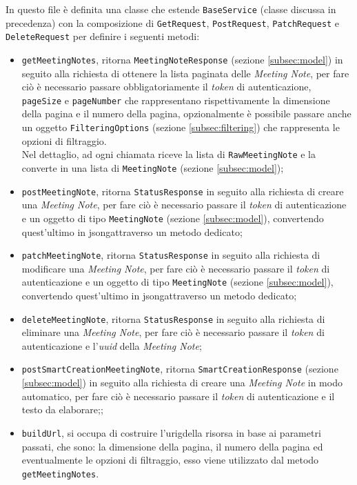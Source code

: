 In questo file è definita una classe che estende \lstinline{BaseService} (classe discussa in precedenza) con la composizione di \lstinline{GetRequest}, \lstinline{PostRequest}, \lstinline{PatchRequest} e \lstinline{DeleteRequest} per definire i seguenti metodi:
\begin{itemize}
    \item \lstinline{getMeetingNotes}, ritorna \lstinline{MeetingNoteResponse} (sezione \ref{subsec:model}) in seguito alla richiesta di ottenere la lista paginata delle \emph{Meeting Note}, per fare ciò è necessario passare obbligatoriamente il \emph{token} di autenticazione, \lstinline{pageSize} e \lstinline{pageNumber} che rappresentano rispettivamente la dimensione della pagina e il numero della pagina, opzionalmente è possibile passare anche un oggetto \lstinline{FilteringOptions} (sezione \ref{subsec:filtering}) che rappresenta le opzioni di filtraggio. \\
    Nel dettaglio, ad ogni chiamata riceve la lista di \lstinline{RawMeetingNote} e la converte in una lista di \lstinline{MeetingNote} (sezione \ref{subsec:model});
    \item \lstinline{postMeetingNote}, ritorna \lstinline{StatusResponse} in seguito alla richiesta di creare una \emph{Meeting Note}, per fare ciò è necessario passare il \emph{token} di autenticazione e un oggetto di tipo \lstinline{MeetingNote} (sezione \ref{subsec:model}), convertendo quest'ultimo in \gls{jsong}\glsoccur attraverso un metodo dedicato;
    \item \lstinline{patchMeetingNote}, ritorna \lstinline{StatusResponse} in seguito alla richiesta di modificare una \emph{Meeting Note}, per fare ciò è necessario passare il \emph{token} di autenticazione e un oggetto di tipo \lstinline{MeetingNote} (sezione \ref{subsec:model}), convertendo quest'ultimo in \gls{jsong}\glsoccur attraverso un metodo dedicato;
    \item \lstinline{deleteMeetingNote}, ritorna \lstinline{StatusResponse} in seguito alla richiesta di eliminare una \emph{Meeting Note}, per fare ciò è necessario passare il \emph{token} di autenticazione e l'\emph{uuid} della \emph{Meeting Note};
    \item \lstinline{postSmartCreationMeetingNote}, ritorna \lstinline{SmartCreationResponse} (sezione \ref{subsec:model}) in seguito alla richiesta di creare una \emph{Meeting Note} in modo automatico, per fare ciò è necessario passare il \emph{token} di autenticazione e il testo da elaborare;;
    \item \lstinline{buildUrl}, si occupa di costruire l'\gls{urig}\glsoccur della risorsa in base ai parametri passati, che sono: la dimensione della pagina, il numero della pagina ed eventualmente le opzioni di filtraggio, esso viene utilizzato dal metodo \lstinline{getMeetingNotes}.
\end{itemize}


